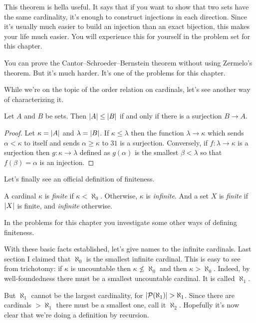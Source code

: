 \documentclass[10pt]{amsart}
\begin{document}
This theorem is hella useful. It says that if you want to show that two sets have the same cardinality, it's enough to construct injections in each direction. Since it's usually much easier to build an injection than an exact bijection, this makes your life much easier. You will experience this for yourself in the problem set for this chapter.

You can prove the Cantor--Schroeder--Bernstein theorem without using Zermelo's theorem. But it's much harder. It's one of the problems for this chapter. 

While we're on the topic of the order relation on cardinals, let's see another way of characterizing it.

\begin{lemma}
Let $A$ and $B$ be sets. Then $\left\lvert A \right\rvert \le \left\lvert B \right\rvert$ if and only if there is a surjection $B \to A$.
\end{lemma}

\begin{proof}
Let $\kappa = \left\lvert A \right\rvert$ and $\lambda = \left\lvert B \right\rvert$. If $\kappa \le \lambda$ then the function $\lambda \to \kappa$ which sends $\alpha < \kappa$ to itself and sends $\alpha \ge \kappa$ to $31$ is a surjection. Conversely, if $f : \lambda \to \kappa$ is a surjection then $g : \kappa \to \lambda$ defined as $g(\alpha)$ is the smallest $\beta < \lambda$ so that $f(\beta) = \alpha$ is an injection.
\end{proof}

Let's finally see an official definition of finiteness.

\begin{definition}
A cardinal $\kappa$ is \emph{finite} if $\kappa < \aleph_0$. Otherwise, $\kappa$ is \emph{infinite}. And a set $X$ is \emph{finite} if $\left\lvert X \right\rvert$ is finite, and \emph{infinite} otherwise.
\end{definition}

In the problems for this chapter you investigate some other ways of defining finiteness.
\smallskip

With these basic facts established, let's give names to the infinite cardinals. Last section I claimed that $\aleph_0$ is the smallest infinite cardinal. This is easy to see from trichotomy: if $\kappa$ is uncountable then $\kappa \not \le \aleph_0$ and then $\kappa > \aleph_0$. Indeed, by well-foundedness there must be a smallest uncountable cardinal. It is called $\aleph_1$. 

But $\aleph_1$ cannot be the largest cardinality, for $\left\lvert \mathcal{P}(\aleph_1) \right\rvert > \aleph_1$. Since there are cardinals $ > \aleph_1$ there must be a smallest one, call it $\aleph_2$. Hopefully it's now clear that we're doing a definition by recursion.
\end{document}
